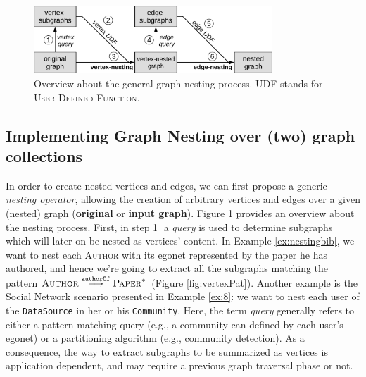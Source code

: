 \begin{figure}[!t]
	\centering
	\includegraphics[width=0.8\textwidth]{fig/06nesting/overview.pdf}
	\caption{Overview about the general graph nesting process. UDF stands for \textsc{User Defined Function}.}
	\label{fig:process}
\end{figure}
\subsection{Implementing Graph Nesting over (two) graph collections}\label{subsec:polyovergraph}

In order to create nested vertices and edges, we can first propose a generic \textit{nesting operator}, allowing the creation of arbitrary vertices and edges over a given (nested) graph (\textbf{original} or \textbf{input graph}). Figure \ref{fig:process} provides an overview about the nesting process. First, in step \textcircled{\raisebox{-.5pt}1} a \textit{query} is used to determine subgraphs which will later on be nested as vertices' content. In Example \vref{ex:nestingbib}, we want to nest each \textsc{Author} with its egonet represented by the paper he has authored, and hence we're going to extract all the subgraphs matching the pattern $\textsc{Author}\overset{\texttt{authorOf}}{\longrightarrow}\textsc{Paper}^*$ (Figure \ref{fig:vertexPat}). Another example is the Social Network scenario presented in Example \vref{ex:8}: we want to nest each user of the \texttt{DataSource} in her or his \texttt{Community}. Here, the term \textit{query} generally refers to either a pattern matching query (e.g., a community can defined by each user's egonet) or a partitioning algorithm (e.g., community detection). As a consequence, the way to extract subgraphs to be summarized as vertices is application dependent, and may require a previous graph traversal phase or not.


